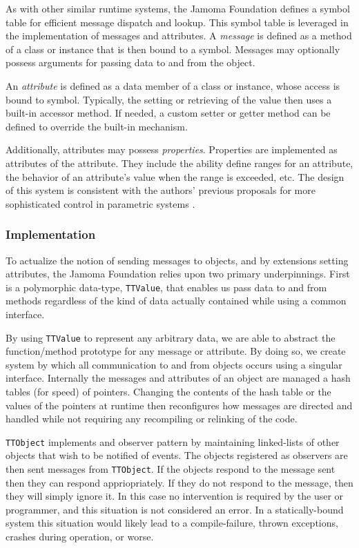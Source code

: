\documentclass[twoside,10pt]{article}
\begin{document}
As with other similar runtime systems, the Jamoma Foundation defines a symbol table for efficient message dispatch and lookup.  This symbol table is leveraged in the implementation of messages and attributes.  
A \emph{message} is defined as a method of a class or instance that is then bound to a symbol.  Messages may optionally possess arguments for passing data to and from the object.

An \emph{attribute} is defined as a data member of a class or instance, whose access is bound to symbol.  Typically, the setting or retrieving of the value then uses a built-in accessor method.  If needed, a custom setter or getter method can be defined to override the built-in mechanism.

Additionally, attributes may possess \emph{properties}.  Properties are implemented as attributes of the attribute.  They include the ability define ranges for an attribute, the behavior of an attribute's value when the range is exceeded, etc.  The design of this system is consistent with the authors' previous proposals for more sophisticated control in parametric systems \cite{Place:2008params}.

\subsubsection{Implementation}

To actualize the notion of sending messages to objects, and by extensions setting attributes, the Jamoma Foundation relies upon two primary underpinnings.  First is a polymorphic data-type, \texttt{TTValue}, that enables us pass data to and from methods regardless of the kind of data actually contained while using a common interface.  %

By using \texttt{TTValue} to represent any arbitrary data, we are able to abstract the function/method prototype for any message or attribute.  By doing so, we create system by which all communication to and from objects occurs using a singular interface.  Internally the messages and attributes of an object are managed a hash tables (for speed) of pointers.  Changing the contents of the hash table or the values of the pointers at runtime then reconfigures how messages are directed and handled while not requiring any recompiling or relinking of the code.

\texttt{TTObject} implements and observer pattern by maintaining linked-lists of other objects that wish to be notified of events.  The objects registered as observers are then sent messages from \texttt{TTObject}.  If the objects respond to the message sent then they can respond appriopriately.  If they do not respond to the message, then they will simply ignore it.  In this case no intervention is required by the user or programmer, and this situation is not considered an error.  In a statically-bound system this situation would likely lead to a compile-failure, thrown exceptions, crashes during operation, or worse.
\end{document}

